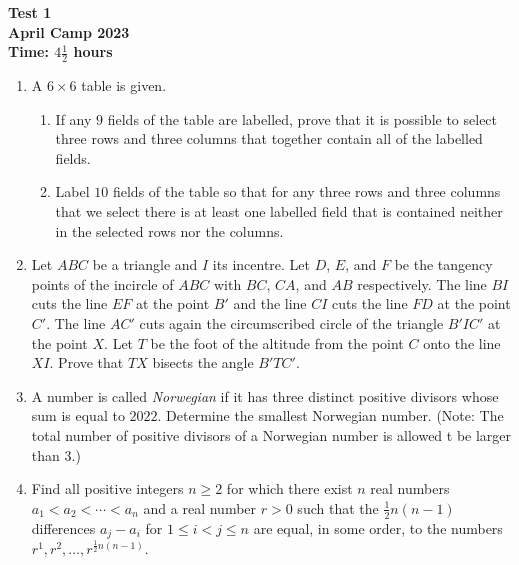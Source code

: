 \documentclass{article}
\begin{document}
\thispagestyle{empty}

\begin{center}
  \textbf{\Large Test 1}
  \\ \vspace{1em}
  \textbf{\large April Camp 2023}
  \\ \vspace{1em}
  \textbf{\large Time: $4\frac{1}{2}$ hours}
\end{center}

\bigskip
\vfill


\begin{enumerate}[itemsep=\fill]


\item %
A $6 \times 6$ table is given.
\begin{enumerate}
  \item If any $9$ fields of the table are labelled, prove that it is possible to select three rows and three columns that together contain all of the labelled fields.
  \item Label $10$ fields of the table so that for any three rows and three columns that we select there is at least one labelled field that is contained neither in the selected rows nor the columns.
\end{enumerate}


\item %
Let $ABC$ be a triangle and $I$ its incentre.
Let $D$, $E$, and $F$ be the tangency points of the incircle of $ABC$ with $BC$, $CA$, and $AB$ respectively.
The line $BI$ cuts the line $EF$ at the point $B'$ and the line $CI$ cuts the line $FD$ at the point $C'$.
The line $AC'$ cuts again the circumscribed circle of the triangle $B'IC'$ at the point $X$.
Let $T$ be the foot of the altitude from the point $C$ onto the line $XI$.
Prove that $TX$ bisects the angle $B'TC'$.


\item %
A number is called \emph{Norwegian} if it has three distinct positive divisors whose sum is equal to $2022$.
Determine the smallest Norwegian number.
(Note: The total number of positive divisors of a Norwegian number is allowed t be larger than $3$.)


\item %
Find all positive integers $n \geq 2$ for which there exist $n$ real numbers $a_1 < a_2 < \dotsb < a_n$ and a real number $r > 0$ such that the $\frac{1}{2}n(n-1)$ differences $a_j-a_i$ for $1 \leq i < j \leq n$ are equal, in some order, to the numbers $r^1, r^2, \dotsc, r^{\frac{1}{2}n(n-1)}$.


\end{enumerate}
\end{document}
